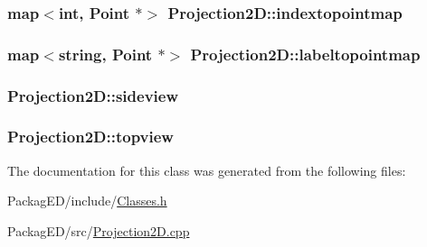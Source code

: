 \subsubsection[{\texorpdfstring{indextopointmap}{indextopointmap}}]{\setlength{\rightskip}{0pt plus 5cm}map$<$int, {\bf Point} $\ast$$>$ Projection2\+D\+::indextopointmap}\hypertarget{class_projection2_d_a08675aad4022218dc78dd54187be18a9}{}\label{class_projection2_d_a08675aad4022218dc78dd54187be18a9}
\subsubsection[{\texorpdfstring{labeltopointmap}{labeltopointmap}}]{\setlength{\rightskip}{0pt plus 5cm}map$<$string, {\bf Point} $\ast$$>$ Projection2\+D\+::labeltopointmap}\hypertarget{class_projection2_d_a0afd92ccd321bc86e6e019b4bec99fc8}{}\label{class_projection2_d_a0afd92ccd321bc86e6e019b4bec99fc8}
\subsubsection[{\texorpdfstring{sideview}{sideview}}]{ Projection2\+D\+::sideview}\hypertarget{class_projection2_d_a82c9e3f197b07ffe9a10f59de60edbee}{}\label{class_projection2_d_a82c9e3f197b07ffe9a10f59de60edbee}
\subsubsection[{\texorpdfstring{topview}{topview}}]{ Projection2\+D\+::topview}\hypertarget{class_projection2_d_a90079954379a766f60ba01ad393327ab}{}\label{class_projection2_d_a90079954379a766f60ba01ad393327ab}


The documentation for this class was generated from the following files\+:\begin{DoxyCompactItemize}
\item 
Packag\+E\+D/include/\hyperlink{_classes_8h}{Classes.\+h}\item 
Packag\+E\+D/src/\hyperlink{_projection2_d_8cpp}{Projection2\+D.\+cpp}\end{DoxyCompactItemize}
